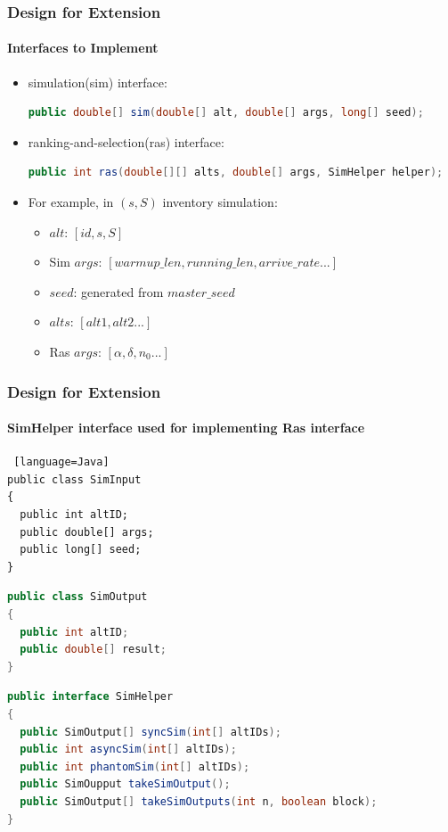 \documentclass{beamer}
\begin{document}
\begin{frame}[fragile]
\frametitle{Design for Extension}
\framesubtitle{Interfaces to Implement}
\begin{itemize}
\item simulation(sim) interface:
\begin{lstlisting}[language=Java]
public double[] sim(double[] alt, double[] args, long[] seed);
\end{lstlisting}
\item ranking-and-selection(ras) interface:
\begin{lstlisting}[language=Java]
public int ras(double[][] alts, double[] args, SimHelper helper);
\end{lstlisting}
\item For example, in $(s, S)$ inventory simulation:
\begin{itemize}
\item $alt$: $[id, s, S]$
\item Sim $args$: $[warmup\_len, running\_len, arrive\_rate...]$
\item $seed$: generated from $master\_seed$
\item $alts$: $[alt1, alt2...]$
\item Ras $args$: $[\alpha, \delta, n_0...]$
\end{itemize}
\end{itemize}
\end{frame}

\begin{frame}[fragile]
\frametitle{Design for Extension}
\framesubtitle{SimHelper interface used for implementing Ras interface}
\begin{lstlisting} [language=Java]
public class SimInput
{
  public int altID;
  public double[] args;
  public long[] seed;
}
\end{lstlisting}
\begin{lstlisting}[language=Java]
public class SimOutput
{
  public int altID;
  public double[] result;
}
\end{lstlisting}
\begin{lstlisting}[language=Java]
public interface SimHelper
{
  public SimOutput[] syncSim(int[] altIDs);
  public int asyncSim(int[] altIDs);
  public int phantomSim(int[] altIDs);
  public SimOupput takeSimOutput();
  public SimOutput[] takeSimOutputs(int n, boolean block);
}
\end{lstlisting}
\end{frame}
\end{document}

